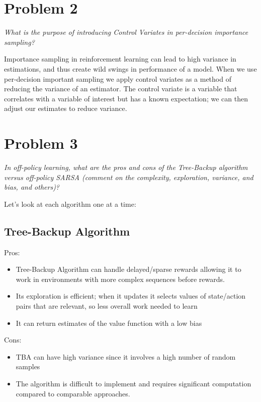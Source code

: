 \documentclass{article}
\begin{document}
\section*{Problem 2}

\textit{What is the purpose of introducing Control Variates in per-decision importance sampling?}

Importance sampling in reinforcement learning can lead to high variance in estimations, and thus create wild swings in performance of a model. When we use per-decision important sampling we apply control variates as a method of reducing the variance of an estimator. The control variate is a variable that correlates with a variable of interest but has a known expectation; we can then adjust our estimates to reduce variance.


\section*{Problem 3}

\textit{In off-policy learning, what are the pros and cons of the Tree-Backup algorithm versus off-policy SARSA (comment on the complexity, exploration, variance, and bias, and others)?}

Let's look at each algorithm one at a time:

\subsection*{Tree-Backup Algorithm}

Pros:
\begin{itemize}
    \item Tree-Backup Algorithm can handle delayed/sparse rewards allowing it to work in environments with more complex sequences before rewards.
    \item Its exploration is efficient; when it updates it selects values of state/action pairs that are relevant, so less overall work needed to learn
    \item It can return estimates of the value function with a low bias
\end{itemize}

Cons:
\begin{itemize}
    \item TBA can have high variance since it involves a high number of random samples
    \item The algorithm is difficult to implement and requires significant computation compared to comparable approaches.
\end{itemize}
\end{document}
